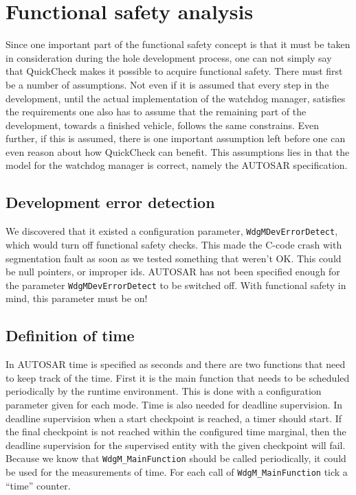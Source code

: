 \section{Functional safety analysis}
Since one important part of the functional safety concept is that it must be
taken in consideration during the hole development process, one can not simply
say that QuickCheck makes it possible to acquire functional safety. There must
first be a number of assumptions. Not even if it is assumed that
every step in the development, until the actual implementation of the watchdog
manager, satisfies the requirements one also has to assume that the remaining
part of the development, towards a finished vehicle, follows the same
constrains. Even further, if this is assumed, there is one important
assumption left before
one can even reason about how QuickCheck can benefit.
This assumptions lies in that the model for the watchdog
manager is correct, namely the AUTOSAR specification.

\subsection{Development error detection}
\label{SEC:DEVERRORDETECT}
We discovered that it existed a configuration parameter,
\lstinline!WdgMDevErrorDetect!, which would turn off functional safety
checks. This made the C-code crash with segmentation fault as soon as we tested
something that weren't OK. This could be null pointers, or improper ids. AUTOSAR
has not been specified enough for the parameter \lstinline!WdgMDevErrorDetect!
to be switched off. With functional safety in mind, this parameter must be on!

\subsection{Definition of time}
\label{SEC:FUNCTIONAL_SAFETY_TIME}
In AUTOSAR time is specified as seconds and there are two functions that need to
keep track of the time. First it is the main function that needs to be scheduled
periodically by the runtime environment. This is done with a configuration
parameter given for each mode. Time is also needed for deadline supervision. In
deadline supervision when a start checkpoint is reached, a timer should
start. If the final checkpoint is not reached within the configured time
marginal, then the deadline supervision for the supervised entity with the given
checkpoint will fail. Because we know that \lstinline!WdgM_MainFunction! should
be called periodically, it could be used for the measurements of time. For each
call of \lstinline!WdgM_MainFunction! tick a ``time'' counter.



